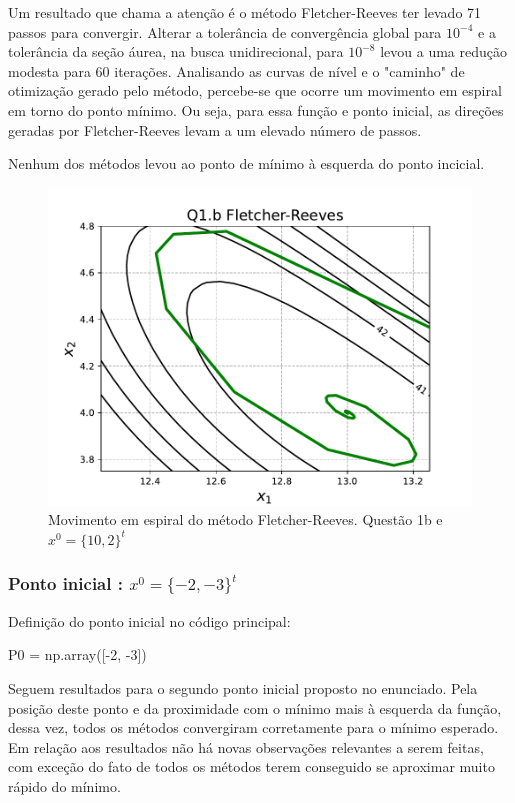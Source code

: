 \documentclass[10pt, a4paper]{article}
\begin{document}
Um resultado que chama a atenção é o método Fletcher-Reeves ter levado 71 passos para convergir. Alterar a tolerância
de convergência global para $10^{-4}$ e a tolerância da seção áurea, na busca unidirecional, para $10^{-8}$ levou a uma
redução modesta para 60 iterações. Analisando as curvas de nível e o "caminho" de otimização gerado pelo método,
percebe-se que ocorre um movimento em espiral em torno do ponto mínimo. Ou seja, para essa função e ponto inicial,
as direções geradas por Fletcher-Reeves levam a um elevado número de passos.

Nenhum dos métodos levou ao ponto de mínimo à esquerda do ponto incicial.

\begin{figure}[H]
  \centering
  \includegraphics[scale=0.5]{figuras/Q1.b_espiral_Fletcher-Reeves_P0=[10e2].pdf}
  \caption{Movimento em espiral do método Fletcher-Reeves. Questão 1b e $x^0 = \{10,2\}^t$ }
\end{figure}

\subsubsection{Ponto inicial : $x^0 = \{-2,-3\}^t $}

Definição do ponto inicial no código principal:
\begin{python}
  P0 = np.array([-2, -3])
\end{python}

Seguem resultados para o segundo ponto inicial proposto no enunciado. Pela posição deste ponto e da proximidade com 
o mínimo mais à esquerda da função, dessa vez, todos os métodos convergiram corretamente para o mínimo esperado.
Em relação aos resultados não há novas observações relevantes a serem feitas, com exceção do fato de todos os métodos
terem conseguido se aproximar muito rápido do mínimo.
\end{document}
